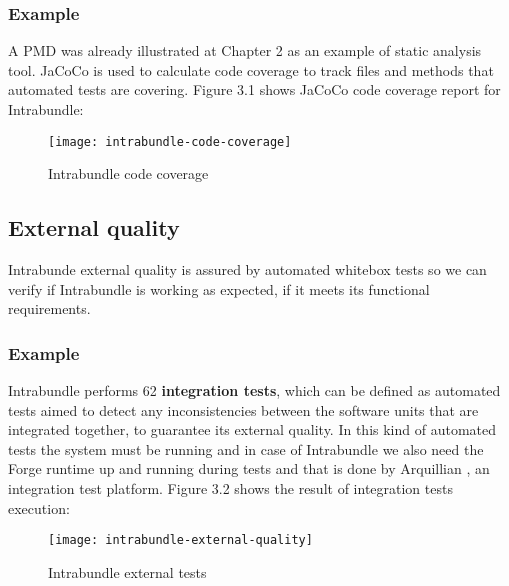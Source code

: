 \subsubsection{Example}
 A PMD was already illustrated at Chapter 2 as an example of static analysis tool. JaCoCo is used to calculate code coverage to track files and methods that automated tests are covering. Figure 3.1 shows JaCoCo code coverage report for Intrabundle:

\begin{figure}[h]
\caption{Intrabundle code coverage}
\texttt{[image: intrabundle-code-coverage]}
\end{figure}

\FloatBarrier

\subsection{External quality}
Intrabunde external quality is assured by automated whitebox tests so we can verify if Intrabundle is working as expected, if it meets its functional requirements.

\subsubsection{Example}
Intrabundle performs 62 \textbf{integration tests}, which can be defined as automated tests aimed to detect any inconsistencies between the software units that are integrated together, to guarantee its external quality. In this kind of automated tests the system must be running and in case of Intrabundle we also need the Forge runtime up and running during tests and that is done by Arquillian \citep{dan 2011}, an integration test platform. Figure 3.2 shows the result of integration tests execution:

\begin{figure}[h]
\caption{Intrabundle external tests}
\texttt{[image: intrabundle-external-quality]}
\end{figure}

\FloatBarrier
